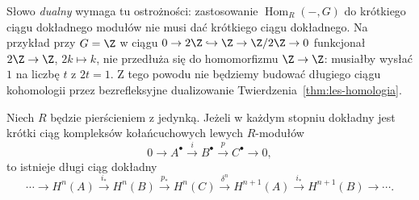 Słowo \emph{dualny} wymaga tu ostrożności:
zastosowanie $\operatorname{Hom}_R(-,G)$
do krótkiego ciągu dokładnego modułów
nie musi dać krótkiego ciągu dokładnego.
Na przykład przy $G=\Z$ w ciągu
$0\to2\Z\hookrightarrow\Z\to\Z/2\Z\to0$
funkcjonał $2\Z\to\Z$, $2k\mapsto k$,
nie przedłuża się do homomorfizmu
$\Z\to\Z$: musiałby wysłać $1$
na liczbę $t$ z $2t=1$.
Z tego powodu nie będziemy budować
długiego ciągu kohomologii przez
bezrefleksyjne dualizowanie
Twierdzenia~\ref{thm:les-homologia}.

\begin{twierdzenie}
\label{thm:les-kohomologia}
Niech $R$ będzie pierścieniem z jedynką.
Jeżeli w każdym stopniu dokładny jest
krótki ciąg kompleksów kołańcuchowych
lewych $R$-modułów
\[
 0\longrightarrow A^\bullet\xrightarrow{i}B^\bullet
 \xrightarrow{p}C^\bullet\longrightarrow0,
\]
to istnieje długi ciąg dokładny
\begin{equation}\label{eq:les-kohomologia}
 \cdots\longrightarrow H^n(A)
 \xrightarrow{i_*}H^n(B)
 \xrightarrow{p_*}H^n(C)
 \xrightarrow{\delta^n}H^{n+1}(A)
 \xrightarrow{i_*}H^{n+1}(B)\longrightarrow\cdots.
\end{equation}
\end{twierdzenie}
